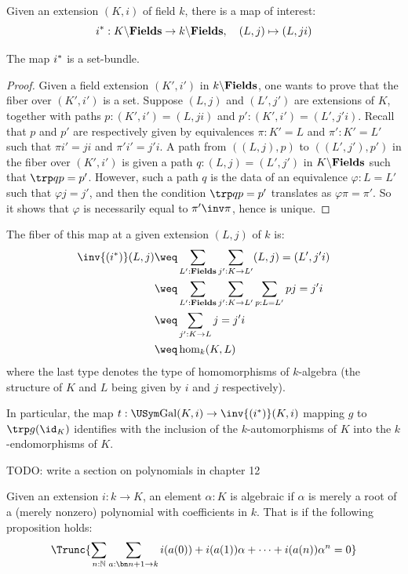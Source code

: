 Given an extension $(K,i)$ of field $k$, there is a map of interest:
\begin{displaymath}
  {{i}^\ast}: K\backslash\mathbf{Fields} \to k\backslash\mathbf{Fields},\quad (L,j) \mapsto (L,ji)
\end{displaymath}

\begin{lemma}
  The map ${{i}^\ast}$ is a set-bundle.
  \label{lem:field-ext-restriction-set-bundle}
\end{lemma}
\begin{proof}
  Given a field extension $(K',i')$ in $k\backslash\mathbf{Fields}$, one wants to prove that
  the fiber over $(K',i')$ is a set. Suppose $(L,j)$ and $(L',j')$ are
  extensions of $K$, together with paths $p:(K',i') = (L,ji)$ and $p': (K',i')
  = (L',j'i)$. Recall that $p$ and $p'$ are respectively given by equivalences
  $\pi: K' = L$ and $\pi': K' = L'$ such that $\pi i' = ji$ and $\pi' i' =
  j'i$. 
  A path from $( (L,j), p)$ to $( (L',j'), p')$ in the fiber over $(K',i')$ is
  given a path $q: (L,j) = (L',j')$ in $K\backslash\mathbf{Fields}$ such that $\trp q p =
  p'$. However, such a path $q$ is the data of an equivalence $\varphi : L =
  L'$ such that $\varphi j = j'$, and then the condition $\trp q p = p'$
  translates as $\varphi \pi = \pi'$. So it shows that $\varphi$ is necessarily
  equal to $\pi'\inv\pi$, hence is unique.  
\end{proof}

The fiber of this map at a given extension $(L,j)$ of $k$ is:
\begin{align*}
  \inv{(\restr i)}(L,j) &\weq \sum_{L':\fieldstype}\sum_{j':K \to L'}(L,j) = (L',j'i) \\
  &\weq \sum_{L':\fieldstype}\sum_{j':K\to L'}\sum_{p:L = L'} pj=j'i \\
  &\weq \sum_{j':K\to L} j=j'i \\
  &\weq \hom_k(K,L)
\end{align*}
where the last type denotes the type of homomorphisms of $k$-algebra (the structure of $K$ and $L$ being given by $i$ and $j$ respectively).

In particular, the map $t: \USym \Gal(K,i) \to \inv{(\restr i)}(K,i)$ mapping $g$ to
$\trp g (\id_K)$ identifies with the inclusion of the $k$-automorphisms of $K$
into the $k$-endomorphisms of $K$.

{\color{red} TODO: write a section on polynomials in chapter 12}
%
\begin{definition}
  Given an extension $i:k\to K$, an element $\alpha:K$ is algebraic if $\alpha$ is merely
  a root of a (merely nonzero) polynomial with coefficients in $k$. That is if the following
  proposition holds:
  \begin{displaymath}
    \Trunc{\sum_{n:\mathbb N}\sum_{a:\bn n + 1 \to k}i(a(0))+i(a(1))\alpha+\cdots+i(a(n))\alpha^n=0}%
  \end{displaymath}
  \label{defn:algebraic-element}
\end{definition}


